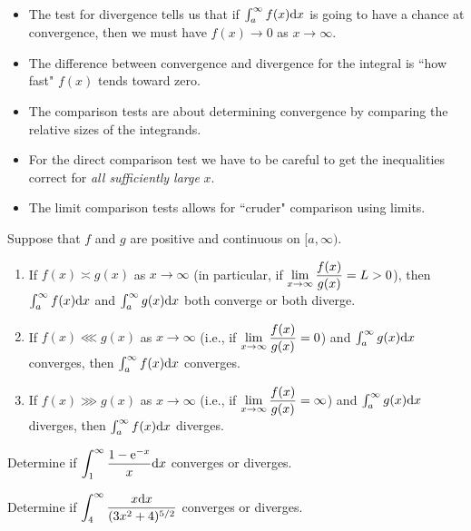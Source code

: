 \begin{remark}\,
\begin{itemize}
\item The test for divergence tells us that if $\int_a^\infty f(x)\mathrm{d} x$ is going to have a chance at convergence, then we must have $f(x)\to 0$ as $x\to\infty$.
\item The difference between convergence and divergence for the integral is ``how fast" $f(x)$ tends toward zero.
\item The comparison tests are about determining convergence by comparing the relative sizes of the integrands.
\item For the direct comparison test we have to be careful to get the inequalities correct for \textit{all sufficiently large} $x$.
\item The limit comparison tests allows for ``cruder" comparison using limits.
\end{itemize}
\end{remark}

\begin{theorem}
Suppose that $f$ and $g$ are positive and continuous on $[a,\infty)$.
\begin{enumerate}
\item If $f(x) \asymp g(x)$ as $x\to\infty$ (in particular, if $\displaystyle\lim_{x\to\infty}\frac{f(x)}{g(x)}=L>0$), 
then $\int_a^\infty f(x)\mathrm{d} x$ and $\int_a^\infty g(x)\mathrm{d} x$ both converge or both diverge.
\item If $f(x) \lll g(x)$ as $x\to\infty$ (i.e., if $\displaystyle\lim_{x\to\infty}\frac{f(x)}{g(x)}=0$) and $\int_a^\infty g(x)\mathrm{d} x$ converges, 
then $\int_a^\infty f(x)\mathrm{d} x$ converges.
\item If $f(x) \ggg g(x)$ as $x\to\infty$ (i.e., if $\displaystyle\lim_{x\to\infty}\frac{f(x)}{g(x)}=\infty$) and $\int_a^\infty g(x)\mathrm{d} x$ diverges, 
then $\int_a^\infty f(x)\mathrm{d} x$ diverges.
\end{enumerate}
\end{theorem}

\begin{example}
Determine if $\displaystyle\int_1^\infty\frac{1-\mathrm{e}^{-x}}{x}\mathrm{d} x$ converges or diverges.
\end{example}

\newpage

\begin{example}
Determine if $\displaystyle\int_4^\infty\frac{x\mathrm{d} x}{(3x^2+4)^{5/2}}$ converges or diverges.
\end{example}
